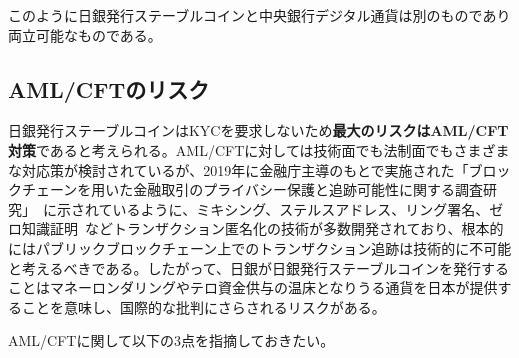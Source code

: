 \documentclass[dvipdfmx,a4paper]{jsarticle}
\begin{document}
このように日銀発行ステーブルコインと中央銀行デジタル通貨は別のものであり両立可能なものである。

\subsection{AML/CFTのリスク}

日銀発行ステーブルコインはKYCを要求しないため\textbf{最大のリスクはAML/CFT対策}であると考えられる。AML/CFTに対しては技術面でも法制面でもさまざまな対応策が検討されているが、2019年に金融庁主導のもとで実施された「ブロックチェーンを用いた金融取引のプライバシー保護と追跡可能性に関する調査研究」~\cite{blockchainprivacy}に示されているように、ミキシング、ステルスアドレス、リング署名、ゼロ知識証明~\cite{sasson2014zerocash}などトランザクション匿名化の技術が多数開発されており、根本的にはパブリックブロックチェーン上でのトランザクション追跡は技術的に不可能と考えるべきである。したがって、日銀が日銀発行ステーブルコインを発行することはマネーロンダリングやテロ資金供与の温床となりうる通貨を日本が提供することを意味し、国際的な批判にさらされるリスクがある。

AML/CFTに関して以下の3点を指摘しておきたい。
\end{document}
